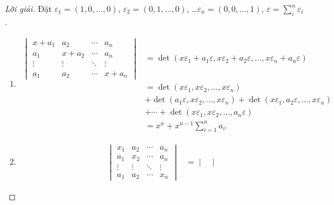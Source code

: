 \begin{proof}[Lời giải]
    Đặt $\varepsilon_{1} = (1, 0, \ldots, 0)$, $\varepsilon_{2} = (0, 1, \ldots, 0)$, \ldots $\varepsilon_{n} = (0, 0, \ldots, 1)$, $\varepsilon = \displaystyle\sum^{n}_{i}\varepsilon_{i}$.
    \begin{enumerate}[label = (\alph*)]
        \item
              \begin{align*}
                  \begin{vmatrix}
                      x + a_{1} & a_{2}     & \cdots & a_{n}     \\
                      a_{1}     & x + a_{2} & \cdots & a_{n}     \\
                      \vdots    & \vdots    & \ddots & \vdots    \\
                      a_{1}     & a_{2}     & \cdots & x + a_{n}
                  \end{vmatrix}
                   & = \det(x\varepsilon_{1} + a_{1}\varepsilon, x\varepsilon_{2} + a_{2}\varepsilon, \ldots, x\varepsilon_{n} + a_{n}\varepsilon)             \\
                   & = \det(x\varepsilon_{1}, x\varepsilon_{2}, \ldots, x\varepsilon_{n})                                                                      \\
                   & + \det(a_{1}\varepsilon, x\varepsilon_{2}, \ldots, x\varepsilon_{n}) + \det(x\varepsilon_{1}, a_{2}\varepsilon, \ldots, x\varepsilon_{n}) \\
                   & + \cdots + \det(x\varepsilon_{1}, x\varepsilon_{2}, \ldots, a_{n}\varepsilon)                                                             \\
                   & = x^{n} + x^{n-1}\sum^{n}_{i=1}a_{i}.
              \end{align*}
        \item
              \begin{align*}
                  \begin{vmatrix}
                      x_{1}  & a_{2}  & \cdots & a_{n}  \\
                      a_{1}  & x_{2}  & \cdots & a_{n}  \\
                      \vdots & \vdots & \ddots & \vdots \\
                      a_{1}  & a_{2}  & \cdots & x_{n}
                  \end{vmatrix}
                   & =
                  \begin{vmatrix}

\end{vmatrix}
\end{align*}
\end{enumerate}
\end{proof}
